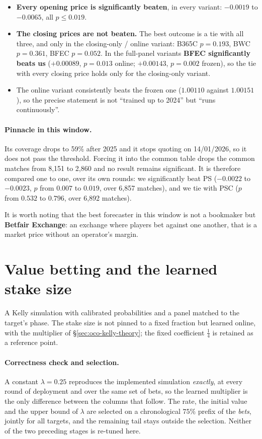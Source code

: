 \documentclass[12pt,a4paper,oneside]{report}
\renewcommand{\_}{\oldunderscore\allowbreak}
\theoremstyle{definition}
\theoremstyle{plain}
\theoremstyle{remark}
\begin{document}
\begin{itemize}
  \item \textbf{Every opening price is significantly beaten}, in every variant: $-0.0019$ to
        $-0.0065$, all $p\leq0.019$.
  \item \textbf{The closing prices are not beaten.} The best outcome is a tie with all three, and
        only in the closing-only / online variant: B365C $p=0.193$, BWC $p=0.361$, BFEC
        $p=0.052$. In the full-panel variants \textbf{BFEC significantly beats us} ($+0.00089$,
        $p=0.013$ online; $+0.00143$, $p=0.002$ frozen), so the tie with every closing price
        holds only for the closing-only variant.
  \item The online variant consistently beats the frozen one ($1.00110$ against $1.00151$), so
        the precise statement is not ``trained up to 2024'' but ``runs continuously''.
\end{itemize}

\paragraph{Pinnacle in this window.} Its coverage drops to 59\% after 2025 and it stops quoting on
14/01/2026, so it does not pass the threshold. Forcing it into the common table drops the common
matches from 8,151 to 2,860 and no result remains significant. It is therefore compared one to
one, over its own rounds: we significantly beat PS ($-0.0022$ to $-0.0023$, $p$ from $0.007$ to
$0.019$, over 6,857 matches), and we tie with PSC ($p$ from $0.532$ to $0.796$, over 6,892
matches).

It is worth noting that the best forecaster in this window is not a bookmaker but \textbf{Betfair
Exchange}: an exchange where players bet against one another, that is a market price without an
operator's margin.

\section{Value betting and the learned stake size}
\label{sec:res-value}

A Kelly simulation with calibrated probabilities and a panel matched to the target's phase. The
stake size is not pinned to a fixed fraction but learned online, with the multiplier of
\S\ref{sec:oco-kelly-theory}; the fixed coefficient $\tfrac14$ is retained as a reference point.

\paragraph{Correctness check and selection.} A constant $\lambda = 0.25$ reproduces the
implemented simulation \emph{exactly}, at every round of deployment and over the same set of
bets, so the learned multiplier is the only difference between the columns that follow. The rate,
the initial value and the upper bound of $\lambda$ are selected on a chronological $75\%$ prefix
of the \emph{bets}, jointly for all targets, and the remaining tail stays outside the selection.
Neither of the two preceding stages is re-tuned here.
\end{document}
